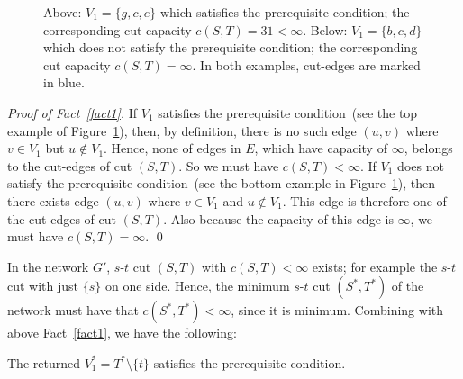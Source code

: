 \begin{figure}[!h]
\centering{}
\caption{Above: $V_1 = \{g,c,e\}$ which satisfies the prerequisite condition;
the corresponding cut capacity $c(S, T) = 31 < \infty$.
Below: $V_1 = \{b,c,d\}$ which does not satisfy the prerequisite condition;
the corresponding cut capacity $c(S, T) = \infty$.
	In both examples, cut-edges are marked in blue.  }
\label{fig:ps4}
\end{figure}


\emph{Proof of Fact~\ref{fact1}.} 
If $V_1$ satisfies the prerequisite
condition~(see the top example of Figure~\ref{fig:ps4}), then, by definition, there is no such edge $(u, v)$ where $v\in V_1$ but $u\not\in V_1$.
Hence, none of edges in $E$, which have capacity of $\infty$, belongs to the cut-edges of cut $(S,T)$.  So we must have $c(S,T) < \infty$.
If $V_1$ does not satisfy the prerequisite
condition~(see the bottom example in Figure~\ref{fig:ps4}), 
then there exists edge $(u, v)$ where $v\in V_1$ and $u\not\in V_1$.
This edge is therefore one of the cut-edges of cut $(S,T)$. 
Also because the capacity of this edge is $\infty$,
we must have $c(S,T) = \infty$.  \qed


In the network $G'$, $s$-$t$ cut $(S,T)$ with $c(S, T) < \infty$ exists; for example the $s$-$t$ cut with just $\{s\}$ on one side.
Hence, the minimum $s$-$t$ cut $(S^*, T^*)$ of the network must have that $c(S^*, T^*) < \infty$, since it is minimum.
Combining with above Fact~\ref{fact1}, we have the following: %
\begin{fact}
The returned $V_1^* = T^*\setminus\{t\}$ satisfies the prerequisite condition.
\end{fact}

